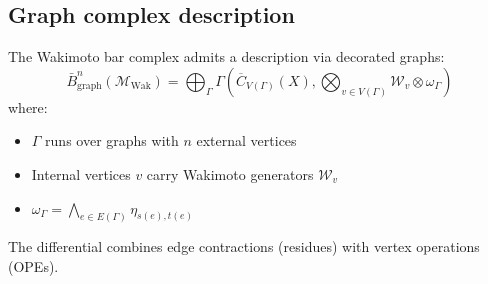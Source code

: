 \subsection{Graph complex description}
 
\begin{proposition}\label{prop:wakimoto-graph}
The Wakimoto bar complex admits a description via decorated graphs:
\[
\bar{B}^n_{\mathrm{graph}}(\mathcal{M}_{\mathrm{Wak}}) = \bigoplus_{\Gamma}
\Gamma\!\left(\overline{C}_{V(\Gamma)}(X), \bigotimes_{v \in V(\Gamma)} \mathcal{W}_v \otimes \omega_\Gamma\right)
\]
where:
\begin{itemize}
\item $\Gamma$ runs over graphs with $n$ external vertices
\item Internal vertices $v$ carry Wakimoto generators $\mathcal{W}_v$
\item $\omega_\Gamma = \bigwedge_{e \in E(\Gamma)} \eta_{s(e),t(e)}$
\end{itemize}
The differential combines edge contractions (residues) with vertex operations (OPEs).
\end{proposition}

